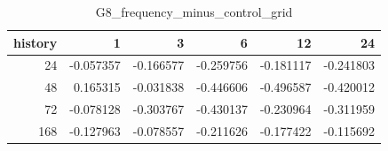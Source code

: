 \begin{table}
\caption{G8_frequency_minus_control_grid}
\label{tab:G8_frequency_minus_control_grid}
\begin{tabular}{rrrrrr}
\toprule
history & 1 & 3 & 6 & 12 & 24 \\
\midrule
24 & -0.057357 & -0.166577 & -0.259756 & -0.181117 & -0.241803 \\
48 & 0.165315 & -0.031838 & -0.446606 & -0.496587 & -0.420012 \\
72 & -0.078128 & -0.303767 & -0.430137 & -0.230964 & -0.311959 \\
168 & -0.127963 & -0.078557 & -0.211626 & -0.177422 & -0.115692 \\
\bottomrule
\end{tabular}
\end{table}
